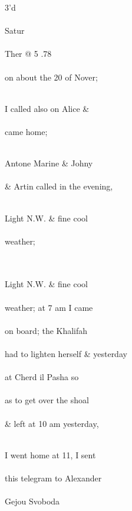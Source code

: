 \documentclass{report}
\begin{document}
	\par{
 	3’d\ \\\ \\Satur\ \\\ \\Ther @ 5 .78\ \\\ \\on about the 20 of Nover;\ \\\ \\
	}

	\par{
 	I called also on Alice \&\ \\\ \\came home;\ \\\ \\
	}

	\par{
 	Antone Marine \& Johny\ \\\ \\\& Artin called in the evening,\ \\\ \\
	}

	\par{
 	Light N.W. \& fine cool\ \\\ \\weather;\ \\\ \\\ \\
	}

	\par{
 	Light N.W. \& fine cool\ \\\ \\weather; at 7 am I came\ \\\ \\on board; the Khalifah\ \\\ \\had to lighten herself \& yesterday\ \\\ \\at Cherd il Pasha so\ \\\ \\as to get over the shoal\ \\\ \\\& left at 10 am yesterday,\ \\\ \\
	}

	\par{
 	I went home at 11, I sent\ \\\ \\this telegram to Alexander\ \\\ \\Gejou Svoboda\ \\\ \\
	}
\end{document}

